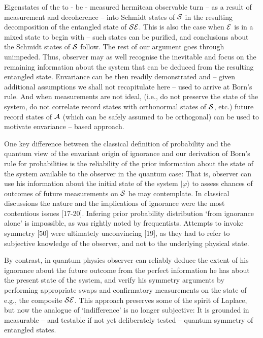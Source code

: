 \documentclass[aps,pra,epsfig,11pt,floatfix]{revtex4}
\begin{document}
Eigenstates of the to - be - measured hermitean observable turn -- as a result
of measurement and decoherence -- into Schmidt states of ${\cal S}$ 
in the resulting decomposition of the entangled state of ${\cal SE}$. 
This is also the case when ${\cal E}$ is in a mixed state to begin with 
-- such states can be purified, and conclusions about the Schmidt states 
of ${\cal S}$ follow. The rest of our argument goes through unimpeded. 
Thus, observer may as well recognise the inevitable and focus on 
the remaining information about the system that can be deduced from 
the resulting entangled state. Envariance can be then readily demonstrated
and -- given additional assumptions we shall not recapitulate here -- used to
arrive at Born's rule. And when measurements are not ideal, (i.e., do not
preserve the state of the system, do not correlate record states with
orthonormal states of ${\cal S}$, etc.) future record states of ${\cal A}$
(which can be safely assumed to be orthogonal) can be used to motivate
envariance -- based approach.

One key difference between the classical definition of probability 
and the quantum view of the envariant origin of ignorance and our
derivation of Born's rule for probabilities is the reliability of the
prior information about the state of the system available to the observer
in the quantum case: That is, observer can use his information about
the initial state of the system $|\varphi\rangle$ to assess chances
of outcomes of future measurements on ${\cal S}$ he may contemplate.
In classical discussions the nature and the implications of ignorance were
the most contentious issues [17-20]. Infering prior probability
distribution `from ignorance alone' is impossible, as was rightly noted by
frequentists. Attempts to invoke symmetry [50] were ultimately unconvincing
[19], as they had to refer to subjective knowledge of the observer, and not
to the underlying physical state.

By contrast, in quantum physics observer can reliably deduce the extent of his
ignorance about the future outcome from the perfect information he has about
the present state of the system, and verify his symmetry arguments by
performing appropriate swaps and confirmatory measurements on the state
of e.g., the composite ${\cal SE}$. This approach preserves some of the spirit
of Laplace, but now the analogue of `indifference' is no longer subjective:
It is grounded in measurable -- and testable if not yet deliberately tested
-- quantum symmetry of entangled states.
\end{document}
